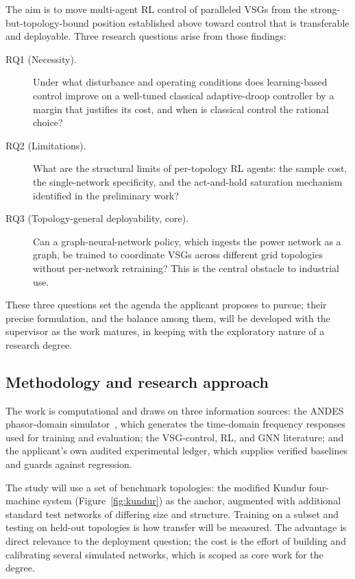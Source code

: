\documentclass[11pt,a4paper]{article}
\begin{document}
The aim is to move multi-agent RL control of paralleled VSGs from the
strong-but-topology-bound position established above toward control that
is transferable and deployable. Three research questions arise from those findings:

\begin{description}
  \item[RQ1 (Necessity).] Under what disturbance and operating
        conditions does learning-based control improve on a well-tuned
        classical adaptive-droop controller by a margin that justifies
        its cost, and when is classical control the rational choice?
  \item[RQ2 (Limitations).] What are the structural limits of
        per-topology RL agents: the sample cost, the single-network
        specificity, and the act-and-hold saturation mechanism
        identified in the preliminary work?
  \item[RQ3 (Topology-general deployability, core).] Can a
        graph-neural-network policy, which ingests the power network as a
        graph, be trained to coordinate VSGs across different grid
        topologies without per-network retraining?
        This is the central obstacle to industrial use.
\end{description}

These three questions set the agenda the applicant proposes to pursue;
their precise formulation, and the balance among them, will be developed
with the supervisor as the work matures, in keeping with the exploratory
nature of a research degree.

\subsection{Methodology and research approach}

The work is computational and draws on three information sources: the
ANDES phasor-domain simulator~\cite{cui2021andes}, which generates the
time-domain frequency responses used for training and evaluation; the
VSG-control, RL, and GNN literature; and the applicant's own audited
experimental ledger, which supplies verified baselines and guards
against regression.

The study will use a set of benchmark
topologies: the modified Kundur four-machine system (Figure~\ref{fig:kundur})
as the
anchor, augmented with additional standard test networks of differing
size and structure. Training on a subset and testing on held-out
topologies is how transfer will be measured. The advantage is direct relevance to
the deployment question; the cost is the effort of building and
calibrating several simulated networks, which is scoped as core work for
the degree.
\end{document}
